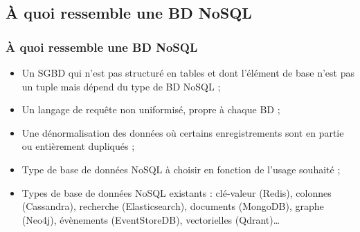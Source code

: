     \subsection{À quoi ressemble une BD NoSQL}
    \begin{frame}
        \frametitle{À quoi ressemble une BD NoSQL}

        \begin{itemize}
            \item Un SGBD qui n'est pas structuré en tables et dont l'élément de base n'est pas un tuple mais dépend du type de BD NoSQL ;
            \item Un langage de requête non uniformisé, propre à chaque BD ;
            \item Une dénormalisation des données où certains enregistrements sont en partie ou entièrement dupliqués ;
            \item Type de base de données NoSQL à choisir en fonction de l'usage souhaité ;
            \item Types de base de données NoSQL existants : clé-valeur (Redis), colonnes (Cassandra), recherche (Elasticsearch), documents (MongoDB), graphe (Neo4j), évènements (EventStoreDB), vectorielles (Qdrant)\dots
        \end{itemize}
    \end{frame}
